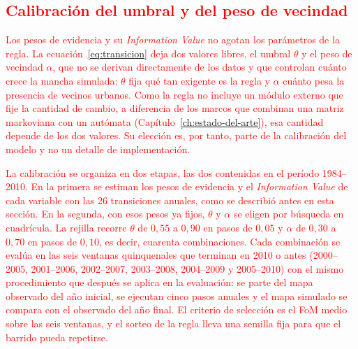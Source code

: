 
\subsection{\textcolor{red}{Calibración del umbral y del peso de vecindad}}
\label{ssec:calibracion-parametros}

\textcolor{red}{Los pesos de evidencia y su \textit{Information Value} no agotan
los parámetros de la regla. La ecuación~\ref{eq:transicion} deja dos valores
libres, el umbral $\theta$ y el peso de vecindad $\alpha$, que no se derivan
directamente de los datos y que controlan cuánto crece la mancha simulada:
$\theta$ fija qué tan exigente es la regla y $\alpha$ cuánto pesa la presencia
de vecinos urbanos. Como la regla no incluye un módulo externo que fije la
cantidad de cambio, a diferencia de los marcos que combinan una matriz
markoviana con un autómata (Capítulo~\ref{ch:estado-del-arte}), esa cantidad
depende de los dos valores. Su elección es, por tanto, parte de la calibración
del modelo y no un detalle de implementación.}

\textcolor{red}{La calibración se organiza en dos etapas, las dos contenidas en
el período 1984--2010. En la primera se estiman los pesos de evidencia y el
\textit{Information Value} de cada variable con las 26 transiciones anuales,
como se describió antes en esta sección. En la segunda, con esos pesos ya
fijos, $\theta$ y $\alpha$ se eligen por búsqueda en cuadrícula. La rejilla
recorre $\theta$ de $0{,}55$ a $0{,}90$ en pasos de $0{,}05$ y $\alpha$ de
$0{,}30$ a $0{,}70$ en pasos de $0{,}10$, es decir, cuarenta combinaciones.
Cada combinación se evalúa en las seis ventanas quinquenales que terminan en
2010 o antes (2000--2005, 2001--2006, 2002--2007, 2003--2008, 2004--2009 y
2005--2010) con el mismo procedimiento que después se aplica en la evaluación:
se parte del mapa observado del año inicial, se ejecutan cinco pasos anuales y
el mapa simulado se compara con el observado del año final. El criterio de
selección es el FoM medio sobre las seis ventanas, y el sorteo de la regla
lleva una semilla fija para que el barrido pueda repetirse.}

